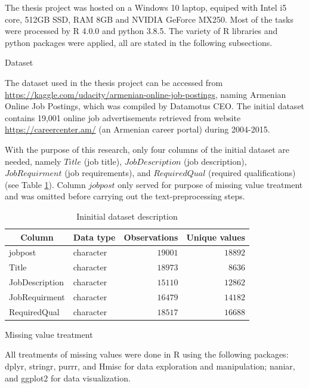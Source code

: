 \documentclass[a4paper,man,floatsintext,natbib,noextraspace]{apa6}
\makeatletter
\renewcommand{\subsection}{\@startsection{subsection}{2}
  {\z@}
  {\b@level@two@skip}
  {\e@level@two@skip}
  {\normalfont\normalsize\bfseries}}
\makeatother
\begin{document}
The thesis project was hosted on a Windows 10 laptop, equiped with Intel i5 core, 512GB SSD, RAM 8GB and NVIDIA GeForce MX250. Most of the tasks were processed by R 4.0.0 and python 3.8.5. The variety of R libraries and python packages were applied, all are stated in the following subsections.

\subsection{Dataset}

The dataset used in the thesis project can be accessed from \url{https://kaggle.com/udacity/armenian-online-job-postings}, naming Armenian Online Job Postings, which was compiled by Datamotus CEO. The initial dataset contains 19,001 online job advertisements retrieved from website \url{https://careercenter.am/} (an Armenian career portal) during 2004-2015. 

With the purpose of this research, only four columns of the initial dataset are needed, namely $Title$ (job title), $JobDescription$ (job description), $JobRequirment$ (job requirements), and $RequiredQual$ (required qualifications) (see Table \ref{tbl:data_description}). Column $jobpost$ only served for purpose of missing value treatment and was omitted before carrying out the text-preprocessing steps.

\begin{table}[!htbp]
    \caption{Ininitial dataset description\label{tbl:data_description}} 
    \begin{center}
    \begin{tabular}{llrr}
    \hline\hline
    \multicolumn{1}{c}{Column}&\multicolumn{1}{c}{Data type}&\multicolumn{1}{c}{Observations}&\multicolumn{1}{c}{Unique values}\tabularnewline
    \hline
    jobpost&character&$19001$&$18892$\tabularnewline
    Title&character&$18973$&$ 8636$\tabularnewline
    JobDescription&character&$15110$&$12862$\tabularnewline
    JobRequirment&character&$16479$&$14182$\tabularnewline
    RequiredQual&character&$18517$&$16688$\tabularnewline
    \hline
    \end{tabular}\end{center}
    \end{table}    

\subsection{Missing value treatment}
  
All treatments of missing values were done in R using the following packages: dplyr, stringr, purrr, and Hmisc for data exploration and manipulation; naniar, and ggplot2 for data visualization.
\end{document}
